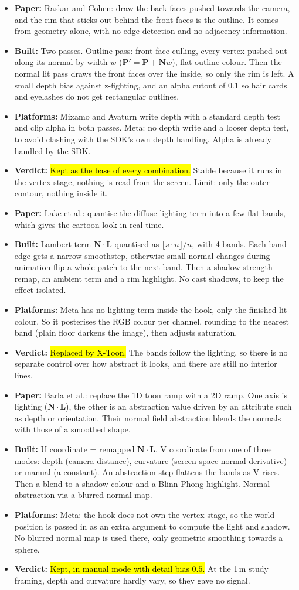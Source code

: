 \documentclass[11pt,a4paper]{article}
\newcommand{\key}[1]{\hl{#1}}
\newcommand{\tech}[5]{\needspace{10\baselineskip}\vspace{0.6em}{\bfseries #1}\par\vspace{0.1em}\begin{itemize}[leftmargin=1.2em,itemsep=0.05em,topsep=0.1em]\small\item\textbf{Paper:} #2 \item\textbf{Built:} #3 \item\textbf{Platforms:} #4 \item\textbf{Verdict:} #5\end{itemize}}
\begin{document}
\tech{V1 — Geometric Silhouette Outline}
{Raskar and Cohen: draw the back faces pushed towards the camera, and the rim that sticks out behind the front faces is the outline. It comes from geometry alone, with no edge detection and no adjacency information.}
{Two passes. Outline pass: front-face culling, every vertex pushed out along its normal by width $w$ ($\mathbf{P}'=\mathbf{P}+\mathbf{N}w$), flat outline colour. Then the normal lit pass draws the front faces over the inside, so only the rim is left. A small depth bias against z-fighting, and an alpha cutout of $0.1$ so hair cards and eyelashes do not get rectangular outlines.}
{Mixamo and Avaturn write depth with a standard depth test and clip alpha in both passes. Meta: no depth write and a looser depth test, to avoid clashing with the SDK's own depth handling. Alpha is already handled by the SDK.}
{\key{Kept as the base of every combination.} Stable because it runs in the vertex stage, nothing is read from the screen. Limit: only the outer contour, nothing inside it.}

\tech{V2 — Toon Shading}
{Lake et al.: quantise the diffuse lighting term into a few flat bands, which gives the cartoon look in real time.}
{Lambert term $\mathbf{N}\cdot\mathbf{L}$ quantised as $\lfloor s\cdot n\rfloor/n$, with 4 bands. Each band edge gets a narrow smoothstep, otherwise small normal changes during animation flip a whole patch to the next band. Then a shadow strength remap, an ambient term and a rim highlight. No cast shadows, to keep the effect isolated.}
{Meta has no lighting term inside the hook, only the finished lit colour. So it posterises the RGB colour per channel, rounding to the nearest band (plain floor darkens the image), then adjusts saturation.}
{\key{Replaced by X-Toon.} The bands follow the lighting, so there is no separate control over how abstract it looks, and there are still no interior lines.}

\tech{V2.2 — X-Toon Shading}
{Barla et al.: replace the 1D toon ramp with a 2D ramp. One axis is lighting ($\mathbf{N}\cdot\mathbf{L}$), the other is an abstraction value driven by an attribute such as depth or orientation. Their normal field abstraction blends the normals with those of a smoothed shape.}
{U coordinate = remapped $\mathbf{N}\cdot\mathbf{L}$. V coordinate from one of three modes: depth (camera distance), curvature (screen-space normal derivative) or manual (a constant). An abstraction step flattens the bands as V rises. Then a blend to a shadow colour and a Blinn-Phong highlight. Normal abstraction via a blurred normal map.}
{Meta: the hook does not own the vertex stage, so the world position is passed in as an extra argument to compute the light and shadow. No blurred normal map is used there, only geometric smoothing towards a sphere.}
{\key{Kept, in manual mode with detail bias $0.5$.} At the 1\,m study framing, depth and curvature hardly vary, so they gave no signal.}
\end{document}
